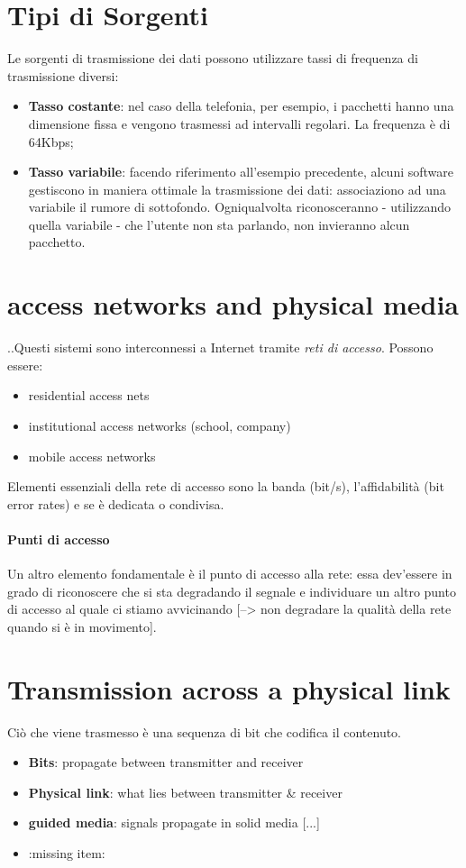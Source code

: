 \section{Tipi di Sorgenti}
Le sorgenti di trasmissione dei dati possono utilizzare tassi di frequenza di trasmissione diversi:
\begin{itemize}
    \item \textbf{Tasso costante}: nel caso della telefonia, per esempio, i pacchetti hanno una dimensione fissa e vengono trasmessi ad intervalli regolari. La frequenza è di 64Kbps;
    \item \textbf{Tasso variabile}: facendo riferimento all'esempio precedente, alcuni software gestiscono in maniera ottimale la trasmissione dei dati: associaziono ad una variabile il rumore di sottofondo. Ogniqualvolta riconosceranno - utilizzando quella variabile - che l'utente non sta parlando, non invieranno alcun pacchetto.
\end{itemize}



\section{access networks and physical media	}
..Questi sistemi sono interconnessi a Internet tramite \textit{reti di accesso}. Possono essere:
\begin{itemize}
	\item residential access nets
	\item institutional access networks (school, company)
	\item mobile access networks
\end{itemize}
Elementi essenziali della rete di accesso sono la banda (bit/s), l'affidabilità (bit error rates) e se è dedicata o condivisa.
\paragraph{Punti di accesso}
Un altro elemento fondamentale è il punto di accesso alla rete: essa dev'essere in grado di riconoscere che si sta degradando il segnale e individuare un altro punto di accesso al quale ci stiamo avvicinando [--> non degradare la qualità della rete quando si è in movimento].
\\

\section{Transmission across a physical link}
Ciò che viene trasmesso è una sequenza di bit che codifica il contenuto.
\begin{itemize}
	\item \textbf{Bits}: propagate between transmitter and receiver
	\item \textbf{Physical link}: what lies between transmitter \& receiver
	\item \textbf{guided media}: signals propagate in solid media [...]
	\item :missing item:
\end{itemize}

